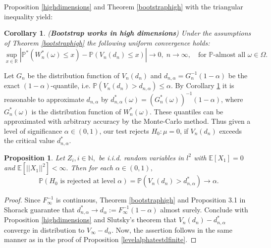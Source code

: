 \documentclass[sn-mathphys,Numbered]{sn-jnl}%
\theoremstyle{thmstyleone}%
\newtheorem{proposition}[theorem]{Proposition}%
\theoremstyle{thmstyletwo}%
\newtheorem{corollary}{Corollary}%
\theoremstyle{thmstylethree}%
\begin{document}
Proposition \ref{highdimensions} and Theorem \ref{bootstraphigh} with the triangular inequality yield:\\

\begin{corollary} \label{bootworkshigh}(\textbf{Bootstrap works in high dimensions}) Under the assumptions of Theorem \ref{bootstraphigh} the following uniform convergence holds:
$$
\sup_{x \in \mathbb{R}}|\mathbb{P}^*(W_n^*(\omega)\le x)-\mathbb{P}(V_n(d_n) \le x)| \rightarrow 0,\; n \rightarrow \infty, \quad \text{for } \mathbb{P}\text{-almost all } \omega \in \Omega.
$$
\end{corollary}

Let $G_n$ be the distribution function of $V_n(d_n)$ and $d_{n,\alpha}=G_n^{-1}(1-\alpha)$ be the exact $(1-\alpha)$-quantile, i.e.
$\mathbb{P}(V_n(d_n) > d_{n,\alpha}) \le \alpha.$ By Corollary \ref{bootworkshigh} it is reasonable to approximate $d_{n,\alpha}$ by
$d_{n,\alpha}^*(\omega) = (G_n^*(\omega))^{-1}(1-\alpha)$, where $G_n^*(\omega)$ is the distribution function of $W_n^*(\omega)$.
These quantiles can be approximated with arbitrary accuracy by the Monte-Carlo method. Thus given a level of significance $\alpha \in (0,1)$, our test rejects $H_0: \mu=0$, if $V_n(d_n)$ exceeds the critical value $d_{n,\alpha}^*$.\\

\begin{proposition} \label{levelalphatestdinfinite} Let $Z_i, i \in \mathbb{N},$ be i.i.d. random variables in $l^2$ with
$\mathbb{E}[X_1]=0$ and $\mathbb{E}[||X_1||^2] < \infty.$ Then for each $\alpha \in (0,1),$
$$
  \mathbb{P}( H_0 \text{ is rejected at level } \alpha )= \mathbb{P}(V_n(d_n) > d_{n,\alpha}^*) \rightarrow \alpha.
$$
\end{proposition}

\begin{proof} Since $F_\infty^{-1}$ is continuous, Theorem \ref{bootstraphigh} and Proposition 3.1 in Shorack guarantee that $d_{n,\alpha}^* \rightarrow d_\alpha := F_\infty^{-1}(1-\alpha)$ almost surely. Conclude with Proposition \ref{highdimensions} and Slutsky's theorem that
$V_n(d_n)- d_{n,\alpha}^*$ converge in distribution to $V_\infty-d_\alpha.$ Now, the assertion follows in the same manner as in the proof of
Proposition \ref{levelalphatestdfinite}.
\end{proof}

\end{document}
